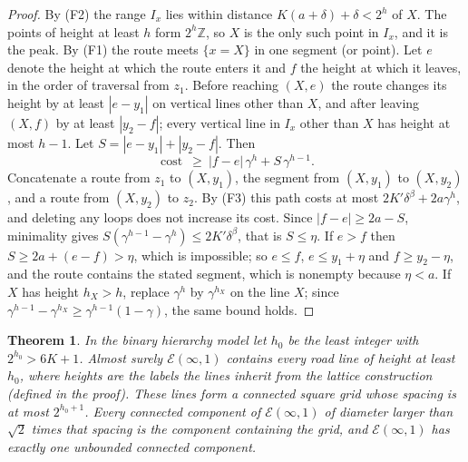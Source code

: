 \documentclass[11pt]{amsart}
\newtheorem{theorem}{Theorem}[section]
\theoremstyle{remark}
\newcommand{\Z}{\mathbb{Z}}
\begin{document}
\begin{proof}
By (F2) the range $I_x$ lies within distance $K(a+\delta)+\delta<2^h$ of $X$. The points of height at least $h$ form
$2^h\Z$, so $X$ is the only such point in $I_x$, and it is the peak. By (F1) the route meets $\{x=X\}$ in one segment
(or point). Let $e$ denote the height at which the route enters it and $f$ the height at which it leaves, in the order
of traversal from $z_1$. Before reaching
$(X,e)$ the route changes its height by at least $|e-y_1|$ on vertical lines other than $X$, and after leaving $(X,f)$
by at least $|y_2-f|$; every vertical line in $I_x$ other than $X$ has height at most $h-1$. Let
$S=|e-y_1|+|y_2-f|$. Then
\[
\operatorname{cost}\ \ge\ |f-e|\,\gamma^{h}+S\,\gamma^{h-1}.
\]
Concatenate a route from $z_1$ to $(X,y_1)$, the segment from $(X,y_1)$ to $(X,y_2)$, and a route from $(X,y_2)$ to
$z_2$. By (F3) this path costs at most $2K'\delta^\beta+2a\gamma^h$, and deleting any loops does not increase its cost.
Since $|f-e|\ge 2a-S$, minimality gives $S(\gamma^{h-1}-\gamma^h)\le2K'\delta^\beta$, that is $S\le\eta$. If $e>f$
then $S\ge 2a+(e-f)>\eta$, which is impossible; so $e\le f$, $e\le y_1+\eta$ and $f\ge y_2-\eta$, and the route
contains the stated segment, which is nonempty because $\eta<a$. If $X$ has height $h_X>h$, replace $\gamma^h$ by
$\gamma^{h_X}$ on the line $X$; since $\gamma^{h-1}-\gamma^{h_X}\ge\gamma^{h-1}(1-\gamma)$, the same bound holds.
\end{proof}

\begin{theorem}\label{thm:roads}
In the binary hierarchy model let $h_0$ be the least integer with $2^{h_0}>6K+1$. Almost surely $\mathcal E(\infty,1)$
contains every road line of height at least $h_0$, where heights are the labels the lines inherit from the lattice
construction (defined in the proof). These lines form a connected square grid whose spacing is at most $2^{h_0+1}$.
Every connected component of $\mathcal E(\infty,1)$ of diameter larger than $\sqrt2$ times that spacing is the
component containing the grid, and $\mathcal E(\infty,1)$ has exactly one unbounded connected component.
\end{theorem}
\end{document}
